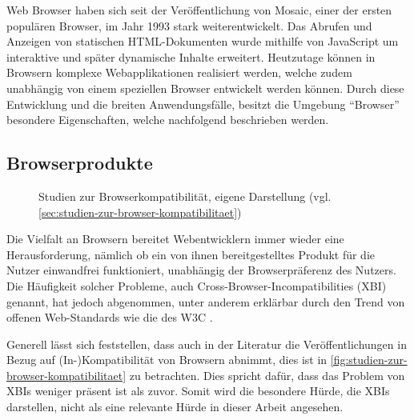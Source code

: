 Web Browser haben sich seit der Veröffentlichung von Mosaic, einer der ersten populären Browser, im Jahr 1993 stark weiterentwickelt. Das Abrufen und Anzeigen von statischen HTML-Dokumenten wurde mithilfe von JavaScript um interaktive und später dynamische Inhalte erweitert. Heutzutage können in Browsern komplexe Webapplikationen realisiert werden, welche zudem unabhängig von einem speziellen Browser entwickelt werden können. Durch diese Entwicklung und die breiten Anwendungsfälle, besitzt die Umgebung \enquote{Browser} besondere Eigenschaften, welche nachfolgend beschrieben werden.

\subsection{Browserprodukte}
\label{sec:browserprodukte}

\begin{wrapfigure}[19]{r}{0.45\textwidth}
\centering
{}
\caption{Studien zur Browserkompatibilität, eigene Darstellung (vgl. \ref{sec:studien-zur-browser-kompatibilitaet})}
\label{fig:studien-zur-browser-kompatibilitaet}
\end{wrapfigure}

Die Vielfalt an Browsern bereitet Webentwicklern immer wieder eine Herausforderung, nämlich ob ein von ihnen bereitgestelltes Produkt für die Nutzer einwandfrei funktioniert, unabhängig der Browserpräferenz des Nutzers. Die Häufigkeit solcher Probleme, auch Cross-Browser-Incompatibilities (XBI) genannt, hat jedoch abgenommen, unter anderem erklärbar durch den Trend von offenen Web-Standards wie die des W3C \cite{W3CStandards}.


Generell lässt sich feststellen, dass auch in der Literatur die Veröffentlichungen in Bezug auf (In-)Kompatibilität von Browsern abnimmt, dies ist in \autoref{fig:studien-zur-browser-kompatibilitaet} zu betrachten. Dies spricht dafür, dass das Problem von XBIs weniger präsent ist als zuvor. Somit wird die besondere Hürde, die XBIs darstellen, nicht als eine relevante Hürde in dieser Arbeit angesehen.

